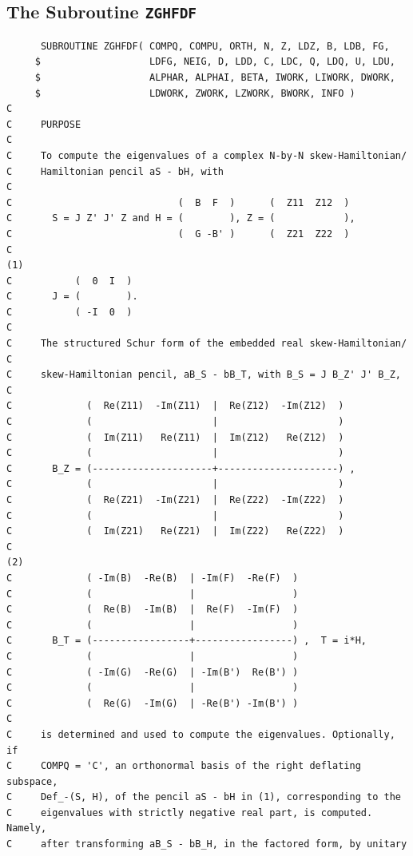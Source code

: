 \documentclass[a4paper,10pt]{article}
\begin{document}
\subsection{The Subroutine \texttt{ZGHFDF}}
%
\begin{verbatim}
      SUBROUTINE ZGHFDF( COMPQ, COMPU, ORTH, N, Z, LDZ, B, LDB, FG,
     $                   LDFG, NEIG, D, LDD, C, LDC, Q, LDQ, U, LDU,
     $                   ALPHAR, ALPHAI, BETA, IWORK, LIWORK, DWORK,
     $                   LDWORK, ZWORK, LZWORK, BWORK, INFO )
C
C     PURPOSE
C
C     To compute the eigenvalues of a complex N-by-N skew-Hamiltonian/
C     Hamiltonian pencil aS - bH, with
C
C                             (  B  F  )      (  Z11  Z12  )
C       S = J Z' J' Z and H = (        ), Z = (            ),
C                             (  G -B' )      (  Z21  Z22  )
C                                                                   (1)
C           (  0  I  )
C       J = (        ).
C           ( -I  0  )
C
C     The structured Schur form of the embedded real skew-Hamiltonian/
C                                                            
C     skew-Hamiltonian pencil, aB_S - bB_T, with B_S = J B_Z' J' B_Z,
C
C             (  Re(Z11)  -Im(Z11)  |  Re(Z12)  -Im(Z12)  )
C             (                     |                     )
C             (  Im(Z11)   Re(Z11)  |  Im(Z12)   Re(Z12)  )
C             (                     |                     )
C       B_Z = (---------------------+---------------------) ,
C             (                     |                     )
C             (  Re(Z21)  -Im(Z21)  |  Re(Z22)  -Im(Z22)  )
C             (                     |                     )
C             (  Im(Z21)   Re(Z21)  |  Im(Z22)   Re(Z22)  )
C                                                                    (2)
C             ( -Im(B)  -Re(B)  | -Im(F)  -Re(F)  )
C             (                 |                 )
C             (  Re(B)  -Im(B)  |  Re(F)  -Im(F)  )
C             (                 |                 )
C       B_T = (-----------------+-----------------) ,  T = i*H,
C             (                 |                 )
C             ( -Im(G)  -Re(G)  | -Im(B')  Re(B') )
C             (                 |                 )
C             (  Re(G)  -Im(G)  | -Re(B') -Im(B') )
C
C     is determined and used to compute the eigenvalues. Optionally, if
C     COMPQ = 'C', an orthonormal basis of the right deflating subspace,
C     Def_-(S, H), of the pencil aS - bH in (1), corresponding to the
C     eigenvalues with strictly negative real part, is computed. Namely,
C     after transforming aB_S - bB_H, in the factored form, by unitary

\end{verbatim}
\end{document}
